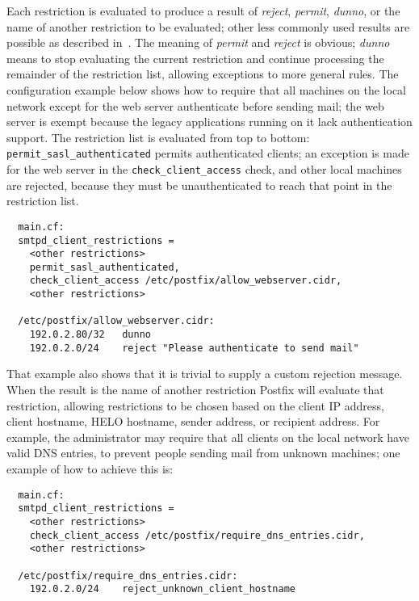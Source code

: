 Each restriction is evaluated to produce a result of \textit{reject},
\textit{permit}, \textit{dunno}, or the name of another restriction to be
evaluated; other less commonly used results are possible as described
in~\cite{access-man-page}.  The meaning of \textit{permit\/} and
\textit{reject\/} is obvious; \textit{dunno\/} means to stop evaluating the
current restriction and continue processing the remainder of the
restriction list, allowing exceptions to more general rules.  The
configuration example below shows how to require that all machines on the
local network except for the web server authenticate before sending mail;
the web server is exempt because the legacy applications running on it lack
authentication support.  The restriction list is evaluated from top to
bottom: \texttt{permit\_sasl\_authenticated} permits authenticated clients;
an exception is made for the web server in the
\texttt{check\_client\_access} check, and other local machines are
rejected, because they must be unauthenticated to reach that point in the
restriction list.

\begin{verbatim}
  main.cf:
  smtpd_client_restrictions =
    <other restrictions>
    permit_sasl_authenticated,
    check_client_access /etc/postfix/allow_webserver.cidr,
    <other restrictions>

  /etc/postfix/allow_webserver.cidr:
    192.0.2.80/32   dunno
    192.0.2.0/24    reject "Please authenticate to send mail"
\end{verbatim}

That example also shows that it is trivial to supply a custom rejection
message.  When the result is the name of another restriction Postfix will
evaluate that restriction, allowing restrictions to be chosen based on the
client IP address, client hostname, HELO hostname, sender address, or
recipient address.  For example, the administrator may require that all
clients on the local network have valid DNS entries, to prevent people
sending mail from unknown machines; one example of how to achieve this is:

\begin{verbatim}
  main.cf:
  smtpd_client_restrictions =
    <other restrictions>
    check_client_access /etc/postfix/require_dns_entries.cidr,
    <other restrictions>

  /etc/postfix/require_dns_entries.cidr:
    192.0.2.0/24    reject_unknown_client_hostname
\end{verbatim}


